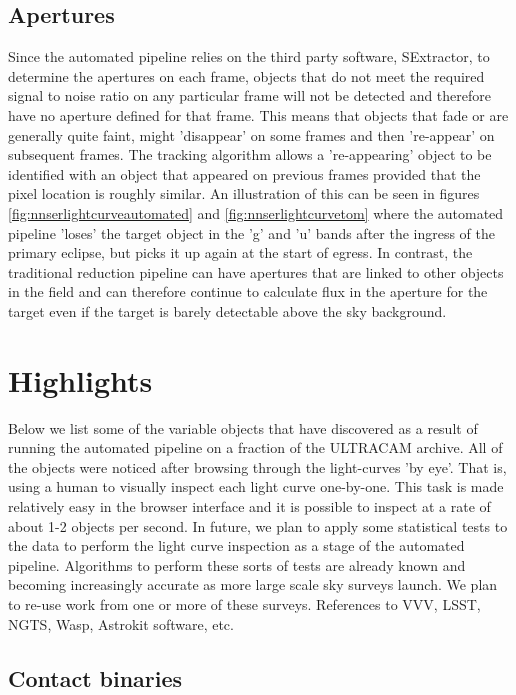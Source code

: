 \subsection{Apertures}
Since the automated pipeline relies on the third party software, SExtractor, to determine the apertures on each frame, objects that do not meet the required signal to noise ratio on any particular frame will not be detected and therefore have no aperture defined for that frame. This means that objects that fade or are generally quite faint, might 'disappear' on some frames and then 're-appear' on subsequent frames. The tracking algorithm allows a 're-appearing' object to be identified with an object that appeared on previous frames provided that the pixel location is roughly similar. An illustration of this can be seen in figures \ref{fig:nnserlightcurveautomated} and \ref{fig:nnserlightcurvetom} where the automated pipeline 'loses' the target object in the 'g' and 'u' bands after the ingress of the primary eclipse, but picks it up again at the start of egress. In contrast, the traditional reduction pipeline can have apertures that are linked to other objects in the field and can therefore continue to calculate flux in the aperture for the target even if the target is barely detectable above the sky background.

\section{Highlights}

Below we list some of the variable objects that have discovered as a result of running the automated pipeline on a fraction of the ULTRACAM archive. All of the objects were noticed after browsing through the light-curves 'by eye'. That is, using a human to visually inspect each light curve one-by-one. This task is made relatively easy in the browser interface and it is possible to inspect at a rate of about 1-2 objects per second. In future, we plan to apply some statistical tests to the data to perform the light curve inspection as a stage of the automated pipeline. Algorithms to perform these sorts of tests are already known and becoming increasingly accurate as more large scale sky surveys launch. We plan to re-use work from one or more of these surveys. References to VVV, LSST, NGTS, Wasp, Astrokit software, etc.

\subsection{Contact binaries}

